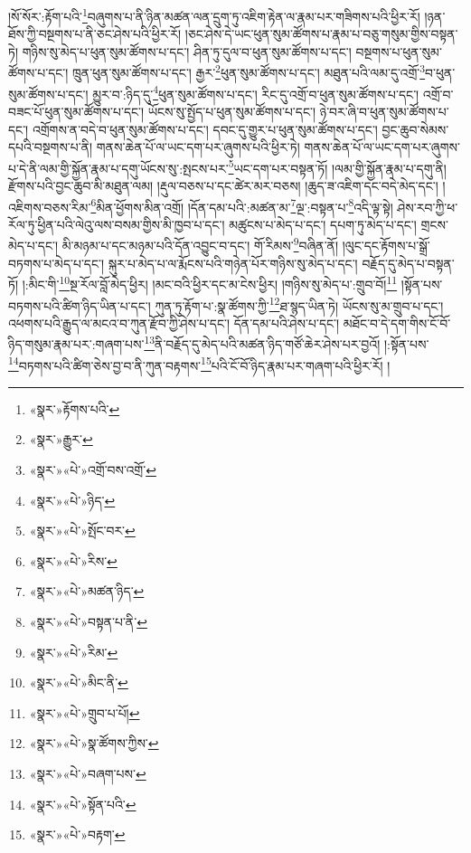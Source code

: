 །སོ་སོར་:རྟོག་པའི་\footnote{«སྣར་»རྟོགས་པའི་}བཞུགས་པ་ནི་ཉིན་མཚན་ལན་དྲུག་ཏུ་འཇིག་རྟེན་ལ་རྣམ་པར་གཟིགས་པའི་ཕྱིར་རོ། །ཉན་ཐོས་ཀྱི་བསྔགས་པ་ནི་ཅང་ཤེས་པའི་ཕྱིར་རོ། །ཅང་ཤེས་དེ་ཡང་ཕུན་སུམ་ཚོགས་པ་རྣམ་པ་བཅུ་གསུམ་གྱིས་བསྟན་ཏེ། གཉིས་སུ་མེད་པ་ཕུན་སུམ་ཚོགས་པ་དང་། ཤིན་ཏུ་དུལ་བ་ཕུན་སུམ་ཚོགས་པ་དང་། བསྔགས་པ་ཕུན་སུམ་ཚོགས་པ་དང་། ཁྲུན་ཕུན་སུམ་ཚོགས་པ་དང་། རྒྱར་\footnote{«སྣར་»རྒྱུར་}ཕུན་སུམ་ཚོགས་པ་དང་། མཐུན་པའི་ལམ་དུ་འགྲོ་\footnote{«སྣར་»«པེ་»འགྲོ་བས་འགྲོ་}བ་ཕུན་སུམ་ཚོགས་པ་དང་། མྱུར་བ་:ཉིད་དུ་\footnote{«སྣར་»«པེ་»ཉིད་}ཕུན་སུམ་ཚོགས་པ་དང་། རིང་དུ་འགྲོ་བ་ཕུན་སུམ་ཚོགས་པ་དང་། འགྲོ་བ་བཟང་པོ་ཕུན་སུམ་ཚོགས་པ་དང་། ཡོངས་སུ་སྤྱོད་པ་ཕུན་སུམ་ཚོགས་པ་དང་། ཉེ་བར་ཞི་བ་ཕུན་སུམ་ཚོགས་པ་དང་། འགྲོགས་ན་བདེ་བ་ཕུན་སུམ་ཚོགས་པ་དང་། དབང་དུ་གྱུར་པ་ཕུན་སུམ་ཚོགས་པ་དང་། བྱང་ཆུབ་སེམས་དཔའི་བསྔགས་པ་ནི། གནས་ཆེན་པོ་ལ་ཡང་དག་པར་ཞུགས་པའི་ཕྱིར་ཏེ། གནས་ཆེན་པོ་ལ་ཡང་དག་པར་ཞུགས་པ་དེ་ནི་ལམ་གྱི་སྐྱོན་རྣམ་པ་དགུ་ཡོངས་སུ་:སྤངས་པར་\footnote{«སྣར་»«པེ་»སྤོང་བར་}ཡང་དག་པར་བསྟན་ཏོ། །ལམ་གྱི་སྐྱོན་རྣམ་པ་དགུ་ནི། རྫོགས་པའི་བྱང་ཆུབ་མི་མཐུན་ལམ། །རྡུལ་བཅས་པ་དང་ཚེར་མར་བཅས། །ཆུད་ཟ་འཇིག་དང་བདེ་མེད་དང་། །འཇིགས་བཅས་རིམ་\footnote{«སྣར་»«པེ་»རིས་}མིན་ཕྱོགས་མིན་འགྲོ། །དོན་དམ་པའི་:མཚན་མ་\footnote{«སྣར་»«པེ་»མཚན་ཉིད་}ལྔ་:བསྟན་པ་\footnote{«སྣར་»«པེ་»བསྟན་པ་ནི་}འདི་ལྟ་སྟེ། ཤེས་རབ་ཀྱི་ཕ་རོལ་ཏུ་ཕྱིན་པའི་ལེའུ་ལས་བསམ་གྱིས་མི་ཁྱབ་པ་དང་། མཚུངས་པ་མེད་པ་དང་། དཔག་ཏུ་མེད་པ་དང་། གྲངས་མེད་པ་དང་། མི་མཉམ་པ་དང་མཉམ་པའི་དོན་འབྱུང་བ་དང་། གོ་རིམས་\footnote{«སྣར་»«པེ་»རིམ་}བཞིན་ནོ། །ལུང་དང་རྟོགས་པ་སྒྲོ་བཏགས་པ་མེད་པ་དང་། སྐུར་པ་མེད་པ་ལ་རྨོངས་པའི་གཉེན་པོར་གཉིས་སུ་མེད་པ་དང་། བརྗོད་དུ་མེད་པ་བསྟན་ཏོ། །:མིང་གི་\footnote{«སྣར་»«པེ་»མིང་ནི་}སྔ་རོལ་བློ་མེད་ཕྱིར། །མང་བའི་ཕྱིར་དང་མ་ངེས་ཕྱིར། །གཉིས་སུ་མེད་པ་:གྲུབ་བོ།\footnote{«སྣར་»«པེ་»གྲུབ་པ་པོ།} །སྟོན་པས་བཏགས་པའི་ཚིག་ཉིད་ཡིན་པ་དང་། ཀུན་ཏུ་རྟོག་པ་:སྣ་ཚོགས་ཀྱི་\footnote{«སྣར་»«པེ་»སྣ་ཚོགས་ཀྱིས་}ཐ་སྙད་ཡིན་ཏེ། ཡོངས་སུ་མ་གྲུབ་པ་དང་། འཕགས་པའི་རྒྱུད་ལ་མངའ་བ་ཀུན་རྫོབ་ཀྱི་ཤེས་པ་དང་། དོན་དམ་པའི་ཤེས་པ་དང་། མཐོང་བ་དེ་དག་གིས་ངོ་བོ་ཉིད་གསུམ་རྣམ་པར་:གཞག་པས་\footnote{«སྣར་»«པེ་»བཞག་པས་}ནི་བརྗོད་དུ་མེད་པའི་མཚན་ཉིད་གཙོ་ཆེར་ཤེས་པར་བྱའོ། །:སྟོན་པས་\footnote{«སྣར་»«པེ་»སྟོན་པའི་}བཏགས་པའི་ཚིག་ཅེས་བྱ་བ་ནི་ཀུན་བརྟགས་\footnote{«སྣར་»«པེ་»བརྟག་}པའི་ངོ་བོ་ཉིད་རྣམ་པར་གཞག་པའི་ཕྱིར་རོ། །
